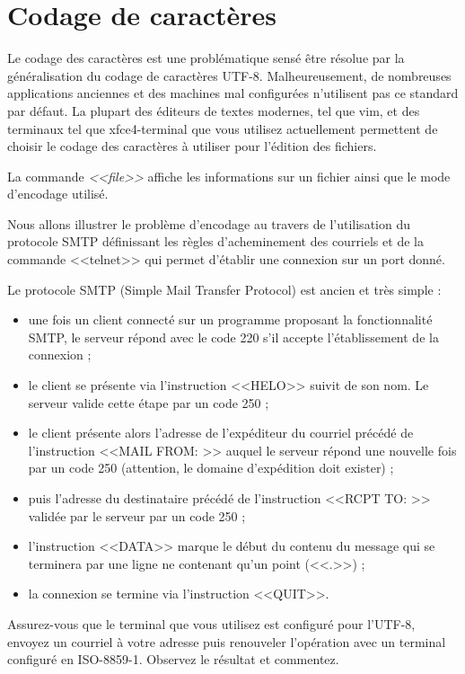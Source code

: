 \documentclass[11pt]{article}
\begin{document}
\section{Codage de caractères}

Le codage des caractères est une problématique sensé être résolue par la
généralisation du codage de caractères UTF-8. Malheureusement, de nombreuses
applications anciennes et des machines mal configurées n'utilisent pas ce
standard par défaut. La plupart des éditeurs de textes modernes, tel que vim, et
des terminaux tel que xfce4-terminal que vous utilisez actuellement permettent
de choisir le codage des caractères à utiliser pour l'édition des fichiers. 

La commande \textit{<<file>>} affiche les informations sur un fichier ainsi que
le mode d'encodage utilisé.

Nous allons illustrer le problème d'encodage au travers de l'utilisation du
protocole SMTP définissant les règles d'acheminement des courriels et de la
commande <<telnet>> qui permet d'établir une connexion sur un port donné.

Le protocole SMTP (Simple Mail Transfer Protocol) est ancien et très simple :
\begin{itemize}

 \item une fois un client connecté sur un programme proposant la fonctionnalité
SMTP, le serveur répond avec le code 220 s'il accepte l'établissement de la
connexion ; 

 \item le client se présente via l'instruction <<HELO>> suivit de son nom. Le
serveur valide cette étape par un code 250 ;

 \item le client présente alors l'adresse de l'expéditeur du courriel précédé de
l'instruction <<MAIL FROM: >> auquel le serveur répond une nouvelle fois par un
code 250 (attention, le domaine d'expédition doit exister) ; 

 \item puis l'adresse du destinataire précédé de l'instruction <<RCPT TO: >>
validée par le serveur par un code 250 ; 

\item l'instruction <<DATA>> marque le début du contenu du message qui se
terminera par une ligne ne contenant qu'un point (<<.>>) ;

\item la connexion se termine via l'instruction <<QUIT>>.

\end{itemize}

Assurez-vous que le terminal que vous utilisez est configuré pour l'UTF-8,
envoyez un courriel à votre adresse puis renouveler l'opération avec un
terminal configuré en ISO-8859-1. Observez le résultat et commentez.

\end{document}
